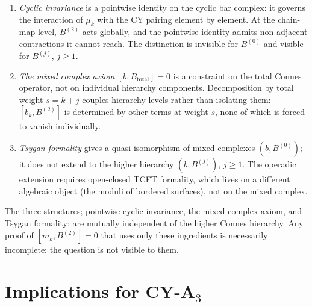 \begin{enumerate}[label=\textup{(\roman*)}]
 \item \emph{Cyclic invariance} is a pointwise identity on the
 cyclic bar complex: it governs the interaction of $\mu_k$ with
 the CY pairing element by element. At the chain-map level,
 $B^{(2)}$ acts globally, and the pointwise identity admits
 non-adjacent contractions it cannot reach. The distinction is
 invisible for $B^{(0)}$ and visible for $B^{(j)}$, $j \geq 1$.
 \item \emph{The mixed complex axiom} $[b, B_{\mathrm{total}}] = 0$
 is a constraint on the total Connes operator, not on individual
 hierarchy components. Decomposition by total weight
 $s = k + j$ couples hierarchy levels rather than isolating them:
 $[b_k, B^{(2)}]$ is determined by other terms at weight $s$,
 none of which is forced to vanish individually.
 \item \emph{Tsygan formality} gives a quasi-isomorphism of mixed
 complexes $(b, B^{(0)})$; it does not extend to the higher
 hierarchy $(b, B^{(j)})$, $j \geq 1$. The operadic extension
 requires open-closed TCFT formality, which lives on a different
 algebraic object (the moduli of bordered surfaces), not on the
 mixed complex.
\end{enumerate}

The three structures; pointwise cyclic invariance, the mixed
complex axiom, and Tsygan formality; are mutually independent
of the higher Connes hierarchy. Any proof of
$[m_k, B^{(2)}] = 0$ that uses only these ingredients is
necessarily incomplete: the question is not visible to them.


\section{Implications for CY-A\texorpdfstring{$_3$}{-3}}
\label{sec:m3b2-implications}

